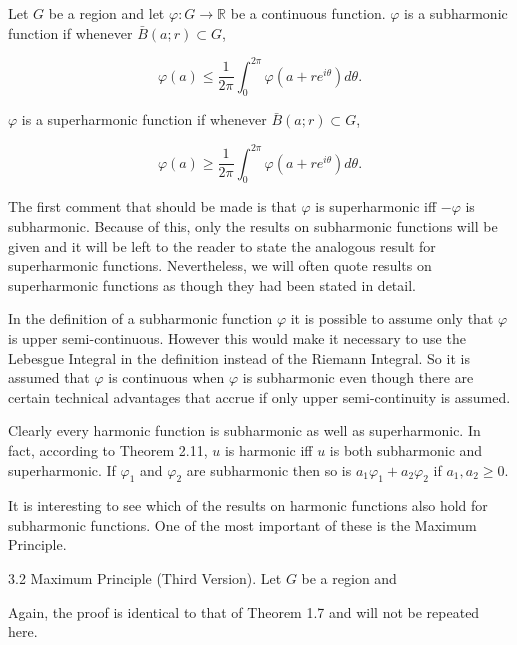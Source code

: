 Let $G$ be a region and let $\varphi: G \to \mathbb{R}$ be a continuous function. $\varphi$ is a subharmonic function if whenever $\bar{B}(a; r) \subset G$,

$$\varphi(a) \leq \frac{1}{2\pi} \int_{0}^{2\pi} \varphi(a + re^{i\theta}) d\theta.$$

$\varphi$ is a superharmonic function if whenever $\bar{B}(a; r) \subset G$,

$$\varphi(a) \geq \frac{1}{2\pi} \int_{0}^{2\pi} \varphi(a + re^{i\theta}) d\theta.$$

The first comment that should be made is that $\varphi$ is superharmonic iff $-\varphi$ is subharmonic. Because of this, only the results on subharmonic functions will be given and it will be left to the reader to state the analogous result for superharmonic functions. Nevertheless, we will often quote results on superharmonic functions as though they had been stated in detail.

In the definition of a subharmonic function $\varphi$ it is possible to assume only that $\varphi$ is upper semi-continuous. However this would make it necessary to use the Lebesgue Integral in the definition instead of the Riemann Integral. So it is assumed that $\varphi$ is continuous when $\varphi$ is subharmonic even though there are certain technical advantages that accrue if only upper semi-continuity is assumed.

Clearly every harmonic function is subharmonic as well as superharmonic. In fact, according to Theorem 2.11, $u$ is harmonic iff $u$ is both subharmonic and superharmonic. If $\varphi_1$ and $\varphi_2$ are subharmonic then so is $a_1\varphi_1 + a_2\varphi_2$ if $a_1, a_2 \geq 0$.

It is interesting to see which of the results on harmonic functions also hold for subharmonic functions. One of the most important of these is the Maximum Principle.

3.2 Maximum Principle (Third Version). Let $G$ be a region and

Again, the proof is identical to that of Theorem 1.7 and will not be repeated here.